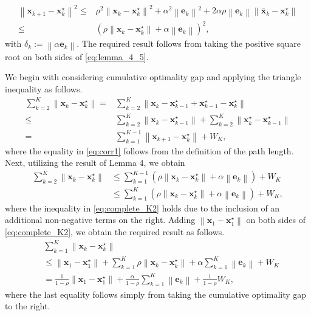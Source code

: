 \documentclass[draftcls,onecolumn,12pt]{IEEEtran}
\theoremstyle{plain}
\def\x{\mathbf{x}}
\def\e{\mathbf{e}}
\def\xks{\x_k^\star}
\providecommand{\norm}[1]{\left\|#1\right\|}
\theoremstyle{plain}
\theoremstyle{remark}
\begin{document}
\begin{IEEEproof}
\begin{align}
	  			 \norm{{{\x}}_{k+1}\!-\!\xks}^{2} \!\! \leq &  \rho^{2} \norm{{\x}_{k} \!-\! \xks}^{2}  \!\!+\! \alpha^2\norm{\e_{k}}^{2}\!\!\! + \!\!2\alpha\rho \norm{\e_{k}} \norm{\bar{\x}_{k}\!-\!\xks} \nonumber\\
	  	\leq & (\rho \norm{{\x}_{k}-\xks} + \alpha\norm{\e_k})^{2}  \label{eq:lemma_4_5},
	  		  				\end{align}
	  				with $\delta_k:=\norm{\alpha\e_k}$. The required result follows from taking the positive square root on both sides of \eqref{eq:lemma_4_5}. 
	  		\end{IEEEproof}
	
				
 \begin{IEEEproof} 
We begin with considering cumulative optimality gap and applying the triangle inequality as follows. 
\begin{align}
\sum_{k=2}^K\norm{\x_k- \xks} = & \sum_{k=2}^K\norm{\x_k- \x_{k-1}^\star + \x_{k-1}^\star - \xks} \nonumber\\
	  		 	 \leq & \sum_{k=2}^K\norm{\x_k- \x_{k-1}^\star} +  \sum\limits_{k=2}^K\norm{\xks - \x_{k-1}^\star} \nonumber \\
= & \sum\limits_{k=1}^{K-1}\norm{\x_{k+1}- \xks} + W_K\label{eq:corr1}	,
\end{align}
where the equality in \eqref{eq:corr1} follows from the definition of the path length. Next, utilizing the result of Lemma 4, we obtain
\begin{align}
\sum_{k=2}^{K}\norm{\x_{k}- \xks } &\leq  \sum_{k=1}^{K-1}(\rho \norm{\x_{k}- \xks} + \alpha\norm{\e_k}) + W_{K} \label{eq:complete_K} \\
&\leq \sum_{k=1}^K(\rho \norm{\x_{k}- \xks} + \alpha\norm{\e_k}) + W_{K} \label{eq:complete_K2},
\end{align}
where the inequality in \eqref{eq:complete_K2} holds due to the inclusion of an additional non-negative terms on the right. Adding $\norm{\x_1-\x_1^\star}$ on both sides of 
\eqref{eq:complete_K2}, we obtain the required result as follows.  
	  		    \begin{align}	\label{eq:complete_K_2}
	  		    &\sum_{k=1}^{K}\norm{\x_{k}- \xks } \nonumber\\
						&\leq   \norm{\x_{1} - \x_{1}^\star} + \sum_{k=1}^{K}\rho \norm{\x_{k}- \xks} + \alpha\sum\limits_{k=1}^K \norm{\e_k}  + W_K \\
						&= \frac{1}{1-\rho}\norm{\x_{1} - \x_{1}^\star}  + \frac{\alpha}{1-\rho}\sum\limits_{k=1}^K \norm{\e_k}  + \frac{1}{1-\rho}W_K,
	  		    \end{align}
where the last equality follows simply from taking the cumulative optimality gap to the right. 
 \end{IEEEproof}		  		
\end{document}
